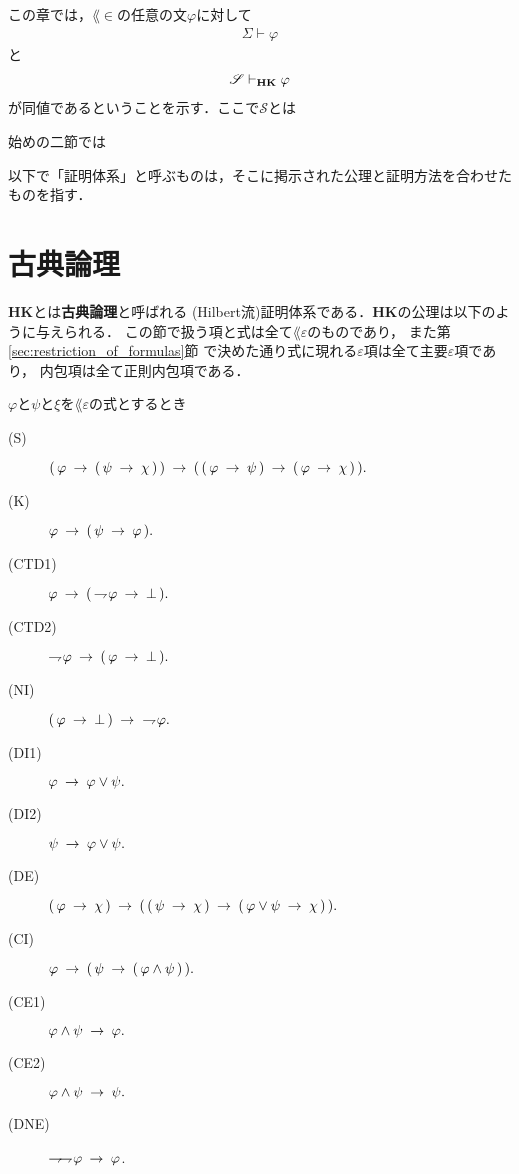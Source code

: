 	この章では，$\lang{\in}$の任意の文$\varphi$に対して
	\begin{align}
		\Sigma \vdash \varphi
	\end{align}
	と
	\begin{align}
		\mathscr{S} \provable{\mbox{{\bf HK}}} \varphi
	\end{align}
	が同値であるということを示す．ここで$\mathscr{S}$とは
	
	始めの二節では
	
	以下で「証明体系」と呼ぶものは，そこに掲示された公理と証明方法を合わせたものを指す．
	
\section{古典論理}
	{\bf HK}とは{\bf 古典論理}と呼ばれる
	(Hilbert流)証明体系である．{\bf HK}の公理は以下のように与えられる．
	この節で扱う項と式は全て$\lang{\varepsilon}$のものであり，
	また第\ref{sec:restriction_of_formulas}節
	で決めた通り式に現れる$\varepsilon$項は全て主要$\varepsilon$項であり，
	内包項は全て正則内包項である．
	
	\begin{screen}
		\begin{logicalaxm}
			$\varphi$と$\psi$と$\xi$を$\lang{\varepsilon}$の式とするとき
			\begin{description}
				\item[(S)] $(\, \varphi \rarrow (\, \psi \rarrow \chi\, )\, ) 
					\rarrow (\, (\, \varphi \rarrow \psi\, )
					\rarrow (\, \varphi \rarrow \chi\, )\, ).$
				\item[(K)] $\varphi \rarrow (\, \psi \rarrow \varphi\, ).$
				\item[(CTD1)] $\varphi \rarrow (\, \negation \varphi \rarrow \bot\, ).$
				\item[(CTD2)] $\negation \varphi \rarrow (\, \varphi \rarrow \bot\, ).$
				\item[(NI)] $(\, \varphi \rarrow \bot\, ) \rarrow\ \negation \varphi.$
				\item[(DI1)] $\varphi \rarrow \varphi \vee \psi.$
				\item[(DI2)] $\psi \rarrow \varphi \vee \psi.$
				\item[(DE)] $(\, \varphi \rarrow \chi\, ) \rarrow 
					(\, (\, \psi \rarrow \chi\, ) 
					\rarrow (\, \varphi \vee \psi \rarrow \chi\, )\, ).$
				\item[(CI)] $\varphi \rarrow (\, \psi \rarrow (\, \varphi \wedge \psi\, )\, ).$
				\item[(CE1)] $\varphi \wedge \psi \rarrow \varphi.$
				\item[(CE2)] $\varphi \wedge \psi \rarrow \psi.$
				\item[(DNE)] $\negation \negation \varphi \rarrow \varphi$.
			\end{description}
		\end{logicalaxm}
	\end{screen}
	
